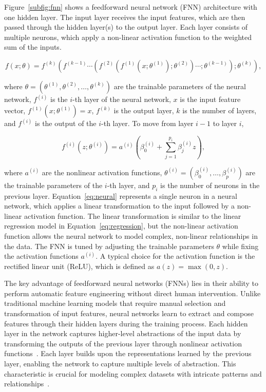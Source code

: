 Figure~\ref{subfig:fnn} shows a feedforward neural network (FNN) architecture with one hidden layer.
The input layer receives the input features, which are then passed through the hidden layer(s) to the output layer.
Each layer consists of multiple neurons, which apply a non-linear activation function to the weighted sum of the inputs.

\begin{equation}
    f(x; \theta) = f^{(k)}(f^{(k-1)} \cdots (f^{(2)}(f^{(1)}(x;\theta^{(1)});\theta^{(2)} )\cdots ;\theta^{(k-1)});\theta^{(k)}),
\end{equation}

where $\theta = (\theta^{(1)}, \theta^{(2)}, \ldots, \theta^{(k)})$ are the trainable parameters of the neural network, $f^{(i)}$ is the $i$-th layer of the neural network, $x$ is the input feature vector, $f^{(1)}(x;\theta^{(1)}) = x$, $f^{(k)}$ is the output layer, $k$ is the number of layers, and $f^{(i)}$ is the output of the $i$-th layer.
To move from layer $i-1$ to layer $i$,

\begin{equation} \label{eq:neural}
    f^{(i)}(z;\theta^{(i)}) = a^{(i)}(\beta_0^{(i)} + \sum_{j=1}^{p_i} \beta_j^{(i)} z),
\end{equation}

where $a^{(i)}$ are the nonlinear activation functions, $\theta^{(i)} = (\beta_0^{(i)}, \dots, \beta_p^{(i)})$ are the trainable parameters of the $i$-th layer, and $p_i$ is the number of neurons in the previous layer.
Equation~\ref{eq:neural} represents a single neuron in a neural network, which applies a linear transformation to the input followed by a non-linear activation function. 
The linear transformation is similar to the linear regression model in Equation~\ref{eq:regression}, but the non-linear activation function allows the neural network to model complex, non-linear relationships in the data.
The FNN is tuned by adjusting the trainable parameters $\theta$ while fixing the activation functions $a^{(i)}$.
A typical choice for the activation function is the rectified linear unit (ReLU), which is defined as $a(z) = \max(0, z)$.

The key advantage of feedforward neural networks (FNNs) lies in their ability to perform automatic feature engineering without direct human intervention. 
Unlike traditional machine learning models that require manual selection and transformation of input features, neural networks learn to extract and compose features through their hidden layers during the training process. 
Each hidden layer in the network captures higher-level abstractions of the input data by transforming the outputs of the previous layer through nonlinear activation functions~\citep{lecun2015deep}.
Each layer builds upon the representations learned by the previous layer, enabling the network to capture multiple levels of abstraction. This characteristic is crucial for modeling complex datasets with intricate patterns and relationships~\citep{bengio2013representation}.


